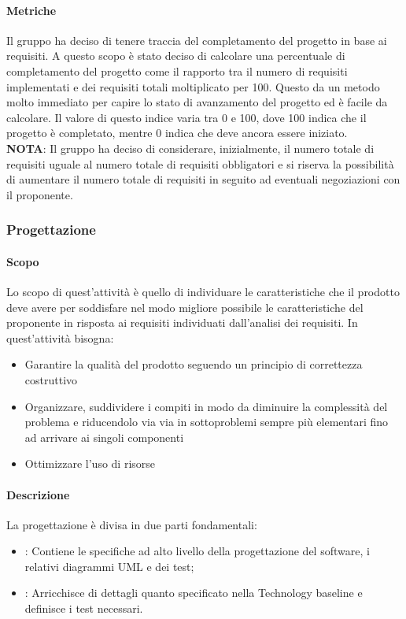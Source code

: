 \documentclass[../norme_di_progetto.tex]{subfiles}
\begin{document}
\paragraph{Metriche}
 Il gruppo ha deciso di tenere traccia del completamento del progetto in base ai requisiti. A questo scopo è stato deciso di calcolare una percentuale di completamento del progetto come il rapporto tra il numero di requisiti implementati e dei requisiti totali moltiplicato per 100. Questo da un metodo molto immediato per capire lo stato di avanzamento del progetto ed è facile da calcolare. Il valore di questo indice varia tra 0 e 100, dove 100 indica che il progetto è completato, mentre 0 indica che deve ancora essere iniziato.\\
 \textbf{NOTA}: Il gruppo ha deciso di considerare, inizialmente, il numero totale di requisiti uguale al numero totale di requisiti obbligatori e si riserva la possibilità di aumentare il numero totale di requisiti in seguito ad eventuali negoziazioni con il proponente.
 
 \subsubsection{Progettazione}
 
 \paragraph{Scopo}
 Lo scopo di quest'attività è quello di individuare le caratteristiche che il prodotto deve avere per soddisfare nel modo migliore possibile le caratteristiche del proponente in risposta ai requisiti individuati dall'analisi dei requisiti. In quest'attività bisogna:
 \begin{itemize}
     \item Garantire la qualità del prodotto seguendo un principio di correttezza costruttivo
     \item Organizzare, suddividere i compiti in modo da diminuire la complessità del problema e riducendolo via via in sottoproblemi sempre più elementari fino ad arrivare ai singoli componenti
     \item Ottimizzare l'uso di risorse
 \end{itemize}
 
 \paragraph{Descrizione}
 La progettazione è divisa in due parti fondamentali:
 \begin{itemize}
     \item {}: Contiene le specifiche ad alto livello della progettazione del software, i relativi diagrammi UML e dei test;
     \item {}: Arricchisce di dettagli quanto specificato nella Technology baseline e definisce i test necessari.
 \end{itemize}
 
\end{document}
